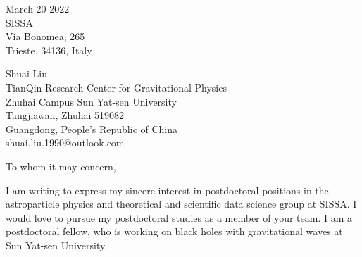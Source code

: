 \documentclass[11pt,a4paper,sans]{letter} %
\date{}
\begin{document}

\begin{letter}{March 20 2022 \\
SISSA \\
Via Bonomea, 265 \\ 
Trieste, 34136, Italy}

Shuai Liu \\
TianQin Research Center for Gravitational Physics \\
Zhuhai Campus Sun Yat-sen University \\
Tangjiawan, Zhuhai 519082 \\
Guangdong, People's Republic of China \\
shuai.liu.1990@outlook.com








\opening{To whom it may concern,} 
 
I am writing to express my sincere interest in postdoctoral positions in the astroparticle physics and theoretical
    and scientific data science group at SISSA. I would love to
pursue my postdoctoral studies as a member of your team. I am a postdoctoral fellow, who is working on black holes with
    gravitational waves at Sun Yat-sen University.


\end{letter}
\end{document}
